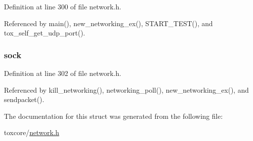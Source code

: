 Definition at line 300 of file network.\+h.



Referenced by main(), new\+\_\+networking\+\_\+ex(), S\+T\+A\+R\+T\+\_\+\+T\+E\+S\+T(), and tox\+\_\+self\+\_\+get\+\_\+udp\+\_\+port().

\hypertarget{struct_networking___core_a35b19d84fb632ca8ce5cab237f7089a5}{
\subsubsection[{sock}]{ sock}}\label{struct_networking___core_a35b19d84fb632ca8ce5cab237f7089a5}


Definition at line 302 of file network.\+h.



Referenced by kill\+\_\+networking(), networking\+\_\+poll(), new\+\_\+networking\+\_\+ex(), and sendpacket().



The documentation for this struct was generated from the following file\+:\begin{DoxyCompactItemize}
\item 
toxcore/\hyperlink{network_8h}{network.\+h}\end{DoxyCompactItemize}
